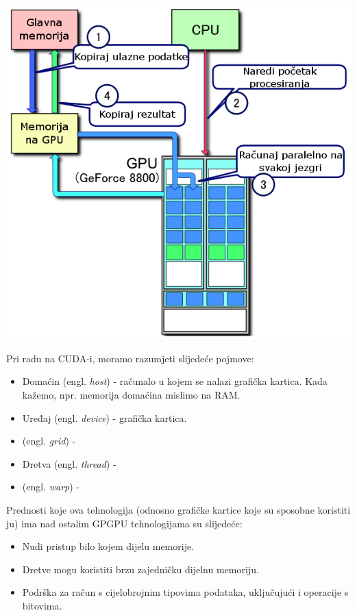 \documentclass[times, utf8, zavrsni]{fer}
\begin{document}
\includegraphics[scale=0.5]{res/CUDA_processing_flow_(hr).PNG}



Pri radu na CUDA-i, moramo razumjeti slijedeće pojmove:
\begin{itemize}
\item
Domaćin (engl. \textit{host}) - računalo u kojem se nalazi grafička kartica.
Kada kažemo, npr. memorija domaćina mislimo na RAM. 

\item
Uređaj (engl. \textit{device}) - grafička kartica.

\item
(engl. \textit{grid}) - 

\item
Dretva (engl. \textit{thread}) - 

\item
(engl. \textit{warp}) -

\end{itemize}

Prednosti koje ova tehnologija (odnosno grafičke kartice koje su
sposobne koristiti ju) ima nad ostalim GPGPU tehnologijama
su slijedeće:

\begin{itemize}
\item
Nudi pristup bilo kojem dijelu memorije. 

\item
Dretve mogu koristiti brzu zajedničku dijelnu memoriju. 

\item
Podrška za račun s cijelobrojnim tipovima podataka, uključujući
i operacije s bitovima.
\end{itemize}
\end{document}
